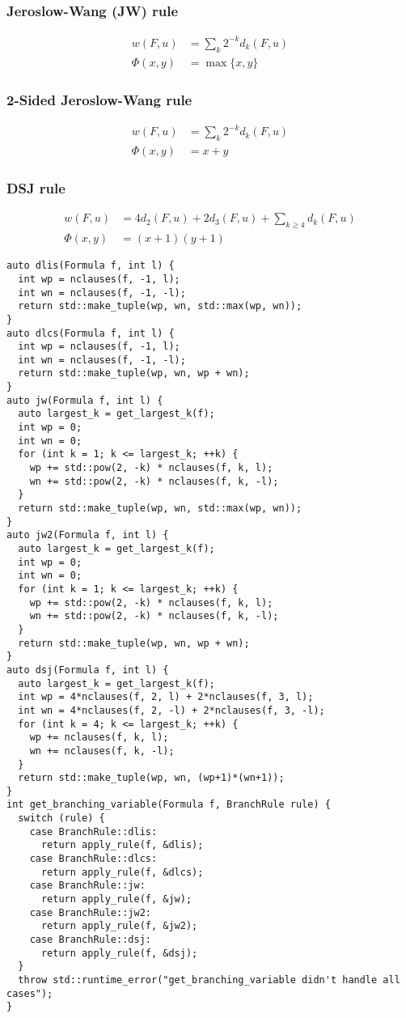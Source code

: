 \documentclass[10pt,AMS Euler]{article}
\begin{document}
\subsubsection*{Jeroslow-Wang (JW) rule}
\label{sec:orgeef19cb}
\begin{align*}
w(F,u) &= \sum_k 2^{-k} d_k(F,u) \\
\Phi(x,y) &= \max\{x,y\}
\end{align*}
\subsubsection*{2-Sided Jeroslow-Wang rule}
\label{sec:org8a5faa7}
\begin{align*}
w(F,u) &= \sum_k 2^{-k} d_k(F,u) \\
\Phi(x,y) &= x + y
\end{align*}
\subsubsection*{DSJ rule}
\label{sec:orgbaaee67}
\begin{align*}
w(F,u) &= 4d_2(F,u) + 2d_3(F,u) + \sum_{k\geq 4} d_k(F,u) \\
\Phi(x,y) &= (x+1)(y+1)
\end{align*}

\begin{verbatim}
auto dlis(Formula f, int l) {
  int wp = nclauses(f, -1, l);
  int wn = nclauses(f, -1, -l);
  return std::make_tuple(wp, wn, std::max(wp, wn));
}
auto dlcs(Formula f, int l) {
  int wp = nclauses(f, -1, l);
  int wn = nclauses(f, -1, -l);
  return std::make_tuple(wp, wn, wp + wn);
}
auto jw(Formula f, int l) {
  auto largest_k = get_largest_k(f);
  int wp = 0;
  int wn = 0;
  for (int k = 1; k <= largest_k; ++k) {
    wp += std::pow(2, -k) * nclauses(f, k, l);
    wn += std::pow(2, -k) * nclauses(f, k, -l);
  }
  return std::make_tuple(wp, wn, std::max(wp, wn));
}
auto jw2(Formula f, int l) {
  auto largest_k = get_largest_k(f);
  int wp = 0;
  int wn = 0;
  for (int k = 1; k <= largest_k; ++k) {
    wp += std::pow(2, -k) * nclauses(f, k, l);
    wn += std::pow(2, -k) * nclauses(f, k, -l);
  }
  return std::make_tuple(wp, wn, wp + wn);
}
auto dsj(Formula f, int l) {
  auto largest_k = get_largest_k(f);
  int wp = 4*nclauses(f, 2, l) + 2*nclauses(f, 3, l);
  int wn = 4*nclauses(f, 2, -l) + 2*nclauses(f, 3, -l);
  for (int k = 4; k <= largest_k; ++k) {
    wp += nclauses(f, k, l);
    wn += nclauses(f, k, -l);
  }
  return std::make_tuple(wp, wn, (wp+1)*(wn+1));
}
int get_branching_variable(Formula f, BranchRule rule) {
  switch (rule) {
    case BranchRule::dlis:
      return apply_rule(f, &dlis);
    case BranchRule::dlcs:
      return apply_rule(f, &dlcs);
    case BranchRule::jw:
      return apply_rule(f, &jw);
    case BranchRule::jw2:
      return apply_rule(f, &jw2);
    case BranchRule::dsj:
      return apply_rule(f, &dsj);
  }
  throw std::runtime_error("get_branching_variable didn't handle all cases");
}
\end{verbatim}
\end{document}
